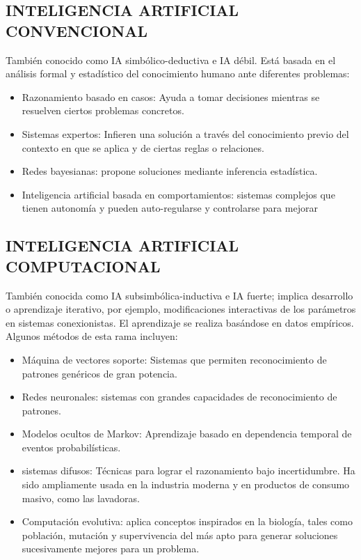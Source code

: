 \subsection{INTELIGENCIA ARTIFICIAL CONVENCIONAL} 

También conocido como IA simbólico-deductiva e IA débil. Está basada en el análisis formal y estadístico del conocimiento humano ante diferentes problemas: \bigskip 

\begin{itemize}
\item Razonamiento basado en casos: Ayuda a tomar decisiones mientras se resuelven ciertos problemas concretos.

\item Sistemas expertos: Infieren una solución a través del conocimiento previo del contexto en que se aplica y de ciertas reglas o relaciones.

\item Redes bayesianas: propone soluciones mediante inferencia estadística.

\item Inteligencia artificial basada en comportamientos: sistemas complejos que tienen autonomía y pueden auto-regularse y controlarse para mejorar
\end{itemize}

\subsection{INTELIGENCIA ARTIFICIAL COMPUTACIONAL} 

También conocida como IA subsimbólica-inductiva e IA fuerte; implica desarrollo o aprendizaje iterativo, por ejemplo, modificaciones interactivas de los parámetros en sistemas conexionistas. El aprendizaje se realiza basándose en datos empíricos. Algunos métodos de esta rama incluyen: \bigskip

\begin{itemize}
\item Máquina de vectores soporte: Sistemas que permiten reconocimiento de patrones genéricos de gran potencia.

\item Redes neuronales: sistemas con grandes capacidades de reconocimiento de patrones.

\item Modelos ocultos de Markov: Aprendizaje basado en dependencia temporal de eventos probabilísticas.

\item sistemas difusos: Técnicas para lograr el razonamiento bajo incertidumbre. Ha sido ampliamente usada en la industria moderna y en productos de consumo masivo, como las lavadoras.

\item Computación evolutiva: aplica conceptos inspirados en la biología, tales como población, mutación y supervivencia del más apto para generar soluciones sucesivamente mejores para un problema.
\end{itemize}

